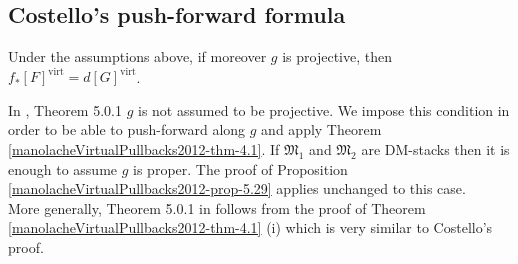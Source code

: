 \subsection{Costello's push-forward formula}\label{manolacheVirtualPullbacks2012-sec-5.5}

\begin{proposition}\label{manolacheVirtualPullbacks2012-prop-5.29}
\label{manolacheVirtualPullbacks2012-costello} Under the assumptions above, if moreover $g$ is projective, then $f_*[F]^{\mathrm{virt}}=d[G]^{\mathrm{virt}}$.
\end{proposition}

\begin{remark}\label{manolacheVirtualPullbacks2012-rem-5.30}
 In \cite{c}, Theorem 5.0.1 $g$ is not assumed to be projective. We impose this condition in order to be able to push-forward along $g$ and apply Theorem \ref{manolacheVirtualPullbacks2012-thm-4.1}. If $\mathfrak{M}_1$ and $\mathfrak{M}_2$ are DM-stacks then it is enough to assume $g$ is proper. The proof of Proposition \ref{manolacheVirtualPullbacks2012-prop-5.29} applies unchanged to this case.
\\More generally, Theorem 5.0.1 in \cite{c} follows from the proof of Theorem \ref{manolacheVirtualPullbacks2012-thm-4.1} (i) which is very similar to Costello's proof.
\end{remark}
